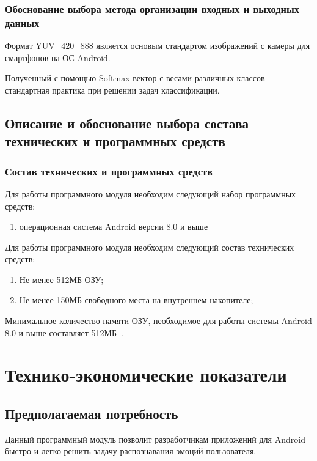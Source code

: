 \documentclass[a4paper,12pt]{article}
\begin{document}
    \subsubsection{Обоснование выбора метода организации входных и выходных данных}

    Формат YUV_420_888 является основым стандартом изображений с камеры для смартфонов на ОС Android.

    Полученный с помощью Softmax вектор с весами различных классов -- стандартная практика при решении задач классификации.

    \subsection{Описание и обоснование выбора состава технических и программных средств}

    \subsubsection{Состав технических и программных средств}
    Для работы программного модуля необходим следующий набор программных средств:
    \begin{enumerate}
        \item операционная система Android версии 8.0 и выше
    \end{enumerate}

    Для работы программного модуля необходим следующий состав технических средств:
    \begin{enumerate}
        \item Не менее 512МБ ОЗУ;
        \item Не менее 150МБ свободного места на внутреннем накопителе;
    \end{enumerate}

    Минимальное количество памяти ОЗУ, необходимое для работы системы Android 8.0 и выше составляет 512МБ~\cite{AndroidReq}.

    \newpage
    \section{Технико-экономические показатели}

    \subsection{Предполагаемая потребность}
    Данный программный модуль позволит разработчикам приложений для Android быстро и легко решить задачу распознавания эмоций пользователя.
\end{document}
